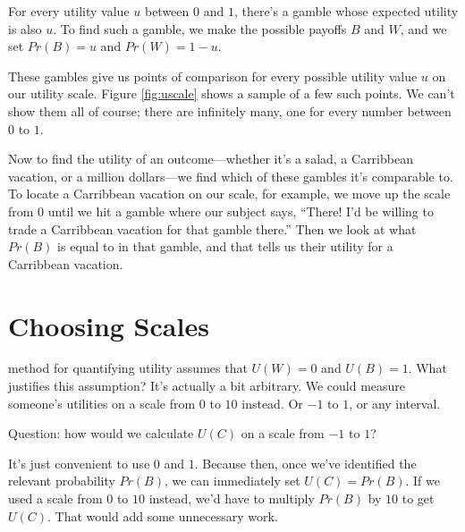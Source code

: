 \documentclass[justified]{tufte-book}
\renewcommand{\u}{U}
\newcommand{\p}{Pr}
\theoremstyle{definition}
\theoremstyle{definition}
\theoremstyle{definition}
\theoremstyle{remark}
\begin{document}
For every utility value \(u\) between \(0\) and \(1\), there's a gamble
whose expected utility is also \(u\). To find such a gamble, we make the
possible payoffs \(B\) and \(W\), and we set \(\p(B) = u\) and
\(\p(W) = 1 - u\).

These gambles give us points of comparison for every possible utility
value \(u\) on our utility scale. Figure \ref{fig:uscale} shows a sample
of a few such points. We can't show them all of course; there are
infinitely many, one for every number between \(0\) to \(1\).

Now to find the utility of an outcome---whether it's a salad, a
Carribbean vacation, or a million dollars---we find which of these
gambles it's comparable to. To locate a Carribbean vacation on our
scale, for example, we move up the scale from 0 until we hit a gamble
where our subject says, ``There! I'd be willing to trade a Carribbean
vacation for that gamble there.'' Then we look at what \(\p(B)\) is
equal to in that gamble, and that tells us their utility for a
Carribbean vacation.

\hypertarget{choosing-scales}{%
\section{Choosing Scales}\label{choosing-scales}}

 method for quantifying utility assumes that
\(\u(W) = 0\) and \(\u(B) = 1\). What justifies this assumption? It's
actually a bit arbitrary. We could measure someone's utilities on a
scale from \(0\) to \(10\) instead. Or \(-1\) to \(1\), or any interval.

\begin{marginfigure}
Question: how would we calculate \(\u(C)\) on a scale from \(-1\) to
\(1\)?
\end{marginfigure}

It's just convenient to use \(0\) and \(1\). Because then, once we've
identified the relevant probability \(\p(B)\), we can immediately set
\(\u(C) = \p(B)\). If we used a scale from \(0\) to \(10\) instead, we'd
have to multiply \(\p(B)\) by \(10\) to get \(\u(C)\). That would add
some unnecessary work.
\end{document}
